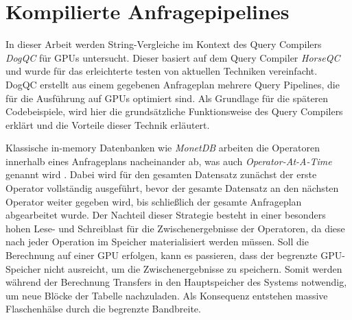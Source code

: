 \chapter{Kompilierte Anfragepipelines}
\label{sec:pipelining}

In dieser Arbeit werden String-Vergleiche im Kontext des Query Compilers \emph{DogQC} für GPUs untersucht.
Dieser basiert auf dem Query Compiler \emph{HorseQC} \cite{Funke2018} und wurde für das erleichterte testen von aktuellen Techniken vereinfacht.
DogQC erstellt aus einem gegebenen Anfrageplan mehrere Query Pipelines, die für die Ausführung auf GPUs optimiert sind.
Als Grundlage für die späteren Codebeispiele, wird hier die grundsätzliche Funktionsweise des Query Compilers erklärt und die Vorteile dieser Technik erläutert.

Klassische in-memory Datenbanken wie \emph{MonetDB} arbeiten die Operatoren innerhalb eines Anfrageplans nacheinander ab, was auch \emph{Operator-At-A-Time} genannt wird \cite{Varga2018}.
Dabei wird für den gesamten Datensatz zunächst der erste Operator vollständig ausgeführt, bevor der gesamte Datensatz an den nächsten Operator weiter gegeben wird, bis schließlich der gesamte Anfrageplan abgearbeitet wurde.
Der Nachteil dieser Strategie besteht in einer besonders hohen Lese- und Schreiblast für die Zwischenergebnisse der Operatoren, da diese nach jeder Operation im Speicher materialisiert werden müssen.
Soll die Berechnung auf einer GPU erfolgen, kann es passieren, dass der begrenzte GPU-Speicher nicht ausreicht, um die Zwischenergebnisse zu speichern.
Somit werden während der Berechnung Transfers in den Hauptspeicher des Systems notwendig, um neue Blöcke der Tabelle nachzuladen.
Als Konsequenz entstehen massive Flaschenhälse durch die begrenzte Bandbreite.

